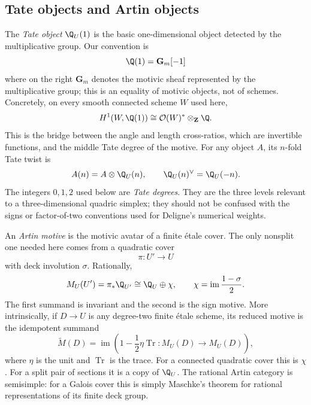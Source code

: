 \subsection{Tate objects and Artin objects}
\label{cp:subsec-tate-artin}

The \emph{Tate object} \(\Q_U(1)\) is the basic one-dimensional object
detected by the multiplicative group.  Our convention is
\[
 \Q(1)=\mathbf G_m[-1]
\]
where on the right \(\mathbf G_m\) denotes the motivic sheaf represented by
the multiplicative group; this is an equality of motivic objects, not of
schemes.
Concretely, on every smooth connected scheme \(W\) used here,
\begin{equation}
 H^1(W,\Q(1))\cong\mathcal O(W)^*\otimes_{\mathbf Z}\Q.
 \label{cp:eq-weight-one-units}
\end{equation}
This is the bridge between the angle and length cross-ratios, which are
invertible functions, and the middle Tate degree of the motive.
For any object \(A\), its \(n\)-fold Tate twist is
\[
 A(n)=A\otimes\Q_U(n),
 \qquad
 \Q_U(n)^\vee=\Q_U(-n).
\]
The integers \(0,1,2\) used below are \emph{Tate degrees}.  They are the
three levels relevant to a three-dimensional quadric simplex; they should
not be confused with the signs or factor-of-two conventions used for
Deligne's numerical weights.

An \emph{Artin motive} is the motivic avatar of a finite \'etale cover.  The
only nonsplit one needed here comes from a quadratic cover
\[
 \pi:U'\longrightarrow U
\]
with deck involution \(\sigma\).  Rationally,
\begin{equation}
 M_U(U')=\pi_*\Q_{U'}\cong \Q_U\oplus\chi,
 \qquad
 \chi=\operatorname{im}\frac{1-\sigma}{2}.
 \label{cp:eq-sign-motive}
\end{equation}
The first summand is invariant and the second is the sign motive.  More
intrinsically, if \(D\to U\) is any degree-two finite \'etale scheme, its
reduced motive is the idempotent summand
\begin{equation}
 \widetilde M(D)=
 \operatorname{im}\left(
  1-\frac12\eta\operatorname{Tr}:M_U(D)\longrightarrow M_U(D)
 \right),
 \label{cp:eq-reduced-artin-motive}
\end{equation}
where \(\eta\) is the unit and \(\operatorname{Tr}\) is the trace.  For a
connected quadratic cover this is \(\chi\).  For a split pair of sections it
is a copy of \(\Q_U\).  The rational Artin category is semisimple: for a
Galois cover this is simply Maschke's theorem for rational representations
of its finite deck group.

